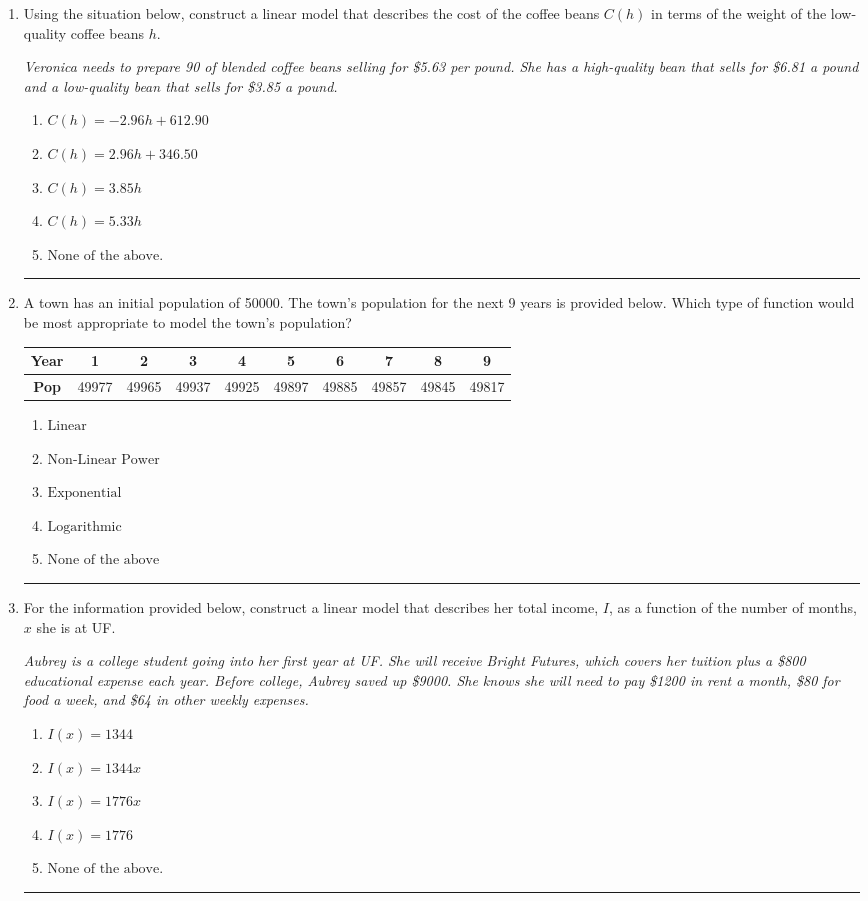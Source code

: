 \documentclass[14pt]{extbook}
\newcommand{\litem}[1]{\item#1\hspace*{-1cm}\rule{\textwidth}{0.4pt}}
\begin{document}
\begin{enumerate}
\litem{
Using the situation below, construct a linear model that describes the cost of the coffee beans $C(h)$ in terms of the weight of the low-quality coffee beans $h$.
\begin{center}
    \textit{ Veronica needs to prepare 90 of blended coffee beans selling for \$5.63 per pound. She has a high-quality bean that sells for \$6.81 a pound and a low-quality bean that sells for \$3.85 a pound. }
\end{center}
\begin{enumerate}[label=\Alph*.]
\item \( C(h) = -2.96 h + 612.90 \)
\item \( C(h) = 2.96 h + 346.50 \)
\item \( C(h) = 3.85 h \)
\item \( C(h) = 5.33 h \)
\item \( \text{None of the above.} \)

\end{enumerate} }
\litem{
A town has an initial population of 50000. The town's population for the next 9 years is provided below. Which type of function would be most appropriate to model the town's population?

\begin{tabular}{c|c|c|c|c|c|c|c|c|c}
\textbf{Year} &1 &2 &3 &4 &5 &6 &7 &8 &9\tabularnewline \hline
\textbf{Pop} &49977 &49965 &49937 &49925 &49897 &49885 &49857 &49845 &49817\end{tabular}\begin{enumerate}[label=\Alph*.]
\item \( \text{Linear} \)
\item \( \text{Non-Linear Power} \)
\item \( \text{Exponential} \)
\item \( \text{Logarithmic} \)
\item \( \text{None of the above} \)

\end{enumerate} }
\litem{
For the information provided below, construct a linear model that describes her total income, $I$, as a function of the number of months, $x$ she is at UF.
\begin{center}
    \textit{ Aubrey is a college student going into her first year at UF. She will receive Bright Futures, which covers her tuition plus a \$800 educational expense each year. Before college, Aubrey saved up \$9000. She knows she will need to pay \$1200 in rent a month, \$80 for food a week, and \$64 in other weekly expenses. }
\end{center}
\begin{enumerate}[label=\Alph*.]
\item \( I(x) = 1344 \)
\item \( I(x) = 1344 x \)
\item \( I(x) = 1776 x \)
\item \( I(x) = 1776 \)
\item \( \text{None of the above.} \)


\end{enumerate}}
\end{enumerate}
\end{document}
